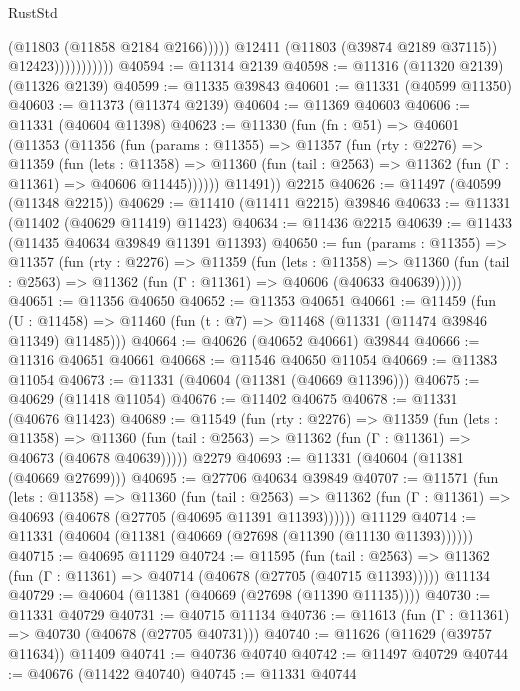 \begin{lexlean}{RustStd}
\begin{coremodule}
                                (@11803 (@11858 @2184 @2166)))))
                          @12411
                          (@11803 (@39874 @2189 @37115))
                          @12423)))))))))))
@40594 := @11314 @2139
@40598 := @11316 (@11320 @2139) (@11326 @2139)
@40599 := @11335 @39843
@40601 := @11331 (@40599 @11350)
@40603 := @11373 (@11374 @2139)
@40604 := @11369 @40603
@40606 := @11331 (@40604 @11398)
@40623 := @11330
    (fun (fn : @51) =>
    @40601
      (@11353
        (@11356
          (fun (params : @11355) =>
          @11357
            (fun (rty : @2276) =>
            @11359
              (fun (lets : @11358) =>
              @11360 (fun (tail : @2563) => @11362 (fun (Γ : @11361) => @40606 @11445))))))
        @11491))
    @2215
@40626 := @11497 (@40599 (@11348 @2215))
@40629 := @11410 (@11411 @2215) @39846
@40633 := @11331 (@11402 (@40629 @11419) @11423)
@40634 := @11436 @2215
@40639 := @11433 (@11435 @40634 @39849 @11391 @11393)
@40650 := fun (params : @11355) =>
  @11357
    (fun (rty : @2276) =>
    @11359
      (fun (lets : @11358) =>
      @11360 (fun (tail : @2563) => @11362 (fun (Γ : @11361) => @40606 (@40633 @40639)))))
@40651 := @11356 @40650
@40652 := @11353 @40651
@40661 := @11459
    (fun (U : @11458) => @11460 (fun (t : @7) => @11468 (@11331 (@11474 @39846 @11349) @11485)))
@40664 := @40626 (@40652 @40661) @39844
@40666 := @11316 @40651 @40661
@40668 := @11546 @40650 @11054
@40669 := @11383 @11054
@40673 := @11331 (@40604 (@11381 (@40669 @11396)))
@40675 := @40629 (@11418 @11054)
@40676 := @11402 @40675
@40678 := @11331 (@40676 @11423)
@40689 := @11549
    (fun (rty : @2276) =>
    @11359
      (fun (lets : @11358) =>
      @11360 (fun (tail : @2563) => @11362 (fun (Γ : @11361) => @40673 (@40678 @40639)))))
    @2279
@40693 := @11331 (@40604 (@11381 (@40669 @27699)))
@40695 := @27706 @40634 @39849
@40707 := @11571
    (fun (lets : @11358) =>
    @11360
      (fun (tail : @2563) =>
      @11362 (fun (Γ : @11361) => @40693 (@40678 (@27705 (@40695 @11391 @11393))))))
    @11129
@40714 := @11331 (@40604 (@11381 (@40669 (@27698 (@11390 (@11130 @11393))))))
@40715 := @40695 @11129
@40724 := @11595
    (fun (tail : @2563) => @11362 (fun (Γ : @11361) => @40714 (@40678 (@27705 (@40715 @11393)))))
    @11134
@40729 := @40604 (@11381 (@40669 (@27698 (@11390 @11135))))
@40730 := @11331 @40729
@40731 := @40715 @11134
@40736 := @11613 (fun (Γ : @11361) => @40730 (@40678 (@27705 @40731)))
@40740 := @11626 (@11629 (@39757 @11634)) @11409
@40741 := @40736 @40740
@40742 := @11497 @40729
@40744 := @40676 (@11422 @40740)
@40745 := @11331 @40744

\end{coremodule}
\end{lexlean}

